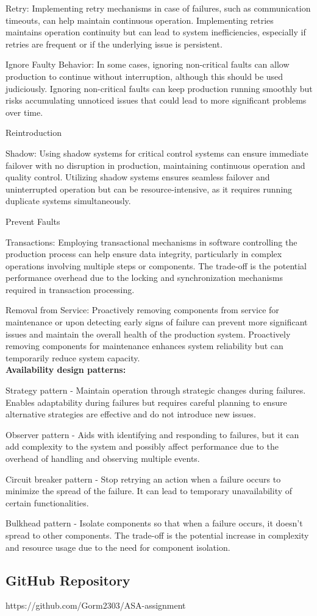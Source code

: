 Retry: Implementing retry mechanisms in case of failures, such as communication timeouts, can help maintain continuous operation. Implementing retries maintains operation continuity but can lead to system inefficiencies, especially if retries are frequent or if the underlying issue is persistent.

Ignore Faulty Behavior: In some cases, ignoring non-critical faults can allow production to continue without interruption, although this should be used judiciously. Ignoring non-critical faults can keep production running smoothly but risks accumulating unnoticed issues that could lead to more significant problems over time.

Reintroduction

Shadow: Using shadow systems for critical control systems can ensure immediate failover with no disruption in production, maintaining continuous operation and quality control. Utilizing shadow systems ensures seamless failover and uninterrupted operation but can be resource-intensive, as it requires running duplicate systems simultaneously.

Prevent Faults

Transactions: Employing transactional mechanisms in software controlling the production process can help ensure data integrity, particularly in complex operations involving multiple steps or components. The trade-off is the potential performance overhead due to the locking and synchronization mechanisms required in transaction processing.

Removal from Service: Proactively removing components from service for maintenance or upon detecting early signs of failure can prevent more significant issues and maintain the overall health of the production system. Proactively removing components for maintenance enhances system reliability but can temporarily reduce system capacity. \\


\textbf{Availability design patterns:}

Strategy pattern - Maintain operation through strategic changes during failures. Enables adaptability during failures but requires careful planning to ensure alternative strategies are effective and do not introduce new issues.

Observer pattern - Aids with identifying and responding to failures, but it can add complexity to the system and possibly affect performance due to the overhead of handling and observing multiple events.

Circuit breaker pattern - Stop retrying an action when a failure occurs to minimize the spread of the failure. It can lead to temporary unavailability of certain functionalities.

Bulkhead pattern - Isolate components so that when a failure occurs, it doesn’t spread to other components. The trade-off is the potential increase in complexity and resource usage due to the need for component isolation.


\subsection{GitHub Repository}
https://github.com/Gorm2303/ASA-assignment

